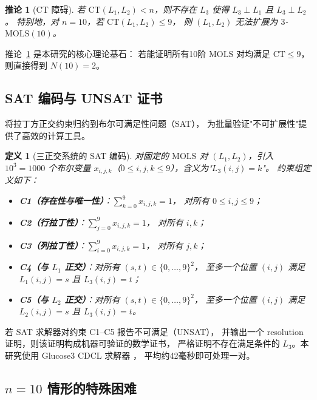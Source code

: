 \documentclass[11pt,a4paper]{ctexart}
\newtheorem{corollary}[theorem]{推论}
\newtheorem{definition}[theorem]{定义}
\theoremstyle{remark}
\newcommand{\CT}{\mathrm{CT}}
\newcommand{\MOLS}{\mathrm{MOLS}}
\begin{document}
\begin{corollary}[CT 障碍]
  \label{cor:ct-barrier}
  若 $\CT(L_1, L_2) < n$，则不存在 $L_3$ 使得 $L_3 \perp L_1$ 且 $L_3 \perp L_2$。
  特别地，对 $n = 10$，若 $\CT(L_1, L_2) \le 9$，
  则 $(L_1, L_2)$ 无法扩展为 $3$-$\MOLS(10)$。
\end{corollary}

推论~\ref{cor:ct-barrier} 是本研究的核心理论基石：
若能证明所有10阶 $\MOLS$ 对均满足 $\CT \le 9$，则直接得到 $N(10) = 2$。

\subsection{SAT 编码与 UNSAT 证书}

将拉丁方正交约束归约到布尔可满足性问题（SAT），
为批量验证"不可扩展性"提供了高效的计算工具。

\begin{definition}[三正交系统的 SAT 编码]
  \label{def:sat}
  对固定的 $\MOLS$ 对 $(L_1, L_2)$，引入 $10^3 = 1000$ 个布尔变量
  $x_{i,j,k}$（$0 \le i, j, k \le 9$），含义为"$L_3(i,j) = k$"。
  约束组定义如下：
  \begin{itemize}
    \item \textbf{C1（存在性与唯一性）}：$\sum_{k=0}^{9} x_{i,j,k} = 1$，
      对所有 $0 \le i, j \le 9$；
    \item \textbf{C2（行拉丁性）}：$\sum_{j=0}^{9} x_{i,j,k} = 1$，
      对所有 $i, k$；
    \item \textbf{C3（列拉丁性）}：$\sum_{i=0}^{9} x_{i,j,k} = 1$，
      对所有 $j, k$；
    \item \textbf{C4（与 $L_1$ 正交）}：对所有 $(s, t) \in \{0,\ldots,9\}^2$，
      至多一个位置 $(i,j)$ 满足 $L_1(i,j) = s$ 且 $L_3(i,j) = t$；
    \item \textbf{C5（与 $L_2$ 正交）}：对所有 $(s, t) \in \{0,\ldots,9\}^2$，
      至多一个位置 $(i,j)$ 满足 $L_2(i,j) = s$ 且 $L_3(i,j) = t$。
  \end{itemize}
\end{definition}

若 SAT 求解器对约束 C1--C5 报告不可满足（UNSAT），
并输出一个 resolution 证明，则该证明构成机器可验证的数学证书，
严格证明不存在满足条件的 $L_3$。本研究使用 Glucose3 CDCL 求解器 \cite{audemard2009}，
平均约42毫秒即可处理一对。

\subsection{$n = 10$ 情形的特殊困难}
\end{document}
